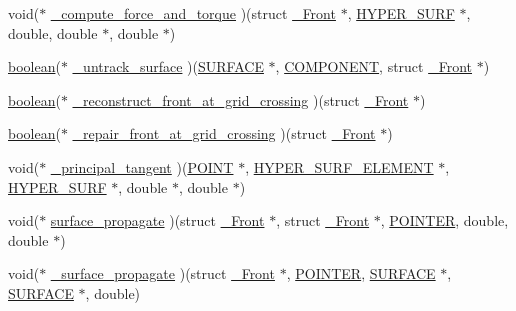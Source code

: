 \begin{DoxyCompactItemize}
\item 
void($\ast$ \hyperlink{struct___front_ae96863439bded0116ac2b342ffa994e1}{\+\_\+compute\+\_\+force\+\_\+and\+\_\+torque} )(struct \hyperlink{struct___front}{\+\_\+\+Front} $\ast$, \hyperlink{int_8h_acef50fa4757ce0d3f75c97fab5a175bc}{H\+Y\+P\+E\+R\+\_\+\+S\+U\+RF} $\ast$, double, double $\ast$, double $\ast$)
\item 
\hyperlink{cdecs_8h_ad048433382a936258fb49e2ec4f148e1}{boolean}($\ast$ \hyperlink{struct___front_aa8daaf6e0ce80e9c3d6e266b57a50e0d}{\+\_\+untrack\+\_\+surface} )(\hyperlink{int_8h_a1520d8870b5eafd76bd401aecb121ffd}{S\+U\+R\+F\+A\+CE} $\ast$, \hyperlink{int_8h_a2bb7be12ca59ea6443c8757df0a7c278}{C\+O\+M\+P\+O\+N\+E\+NT}, struct \hyperlink{struct___front}{\+\_\+\+Front} $\ast$)
\item 
\hyperlink{cdecs_8h_ad048433382a936258fb49e2ec4f148e1}{boolean}($\ast$ \hyperlink{struct___front_a999d7f1b6956921b4b3ff164dea01d87}{\+\_\+reconstruct\+\_\+front\+\_\+at\+\_\+grid\+\_\+crossing} )(struct \hyperlink{struct___front}{\+\_\+\+Front} $\ast$)
\item 
\hyperlink{cdecs_8h_ad048433382a936258fb49e2ec4f148e1}{boolean}($\ast$ \hyperlink{struct___front_a5990b74ab1e3f34ecdaf4ac4fa8d1ed5}{\+\_\+repair\+\_\+front\+\_\+at\+\_\+grid\+\_\+crossing} )(struct \hyperlink{struct___front}{\+\_\+\+Front} $\ast$)
\item 
void($\ast$ \hyperlink{struct___front_a7ed50ad2f247eb749c567b421aeb737e}{\+\_\+principal\+\_\+tangent} )(\hyperlink{int_8h_a3a87c5c9d0146e30a4bf720f701e5a63}{P\+O\+I\+NT} $\ast$, \hyperlink{int_8h_a17e21ae7174174d7a55516f8c9a8f12f}{H\+Y\+P\+E\+R\+\_\+\+S\+U\+R\+F\+\_\+\+E\+L\+E\+M\+E\+NT} $\ast$, \hyperlink{int_8h_acef50fa4757ce0d3f75c97fab5a175bc}{H\+Y\+P\+E\+R\+\_\+\+S\+U\+RF} $\ast$, double $\ast$, double $\ast$)
\item 
void($\ast$ \hyperlink{struct___front_a601a0a2e0085b77301f642c167e620f3}{surface\+\_\+propagate} )(struct \hyperlink{struct___front}{\+\_\+\+Front} $\ast$, struct \hyperlink{struct___front}{\+\_\+\+Front} $\ast$, \hyperlink{cdecs_8h_ae51a81000f343b8ec43bca1f6a723d7b}{P\+O\+I\+N\+T\+ER}, double, double $\ast$)
\item 
void($\ast$ \hyperlink{struct___front_ac039d7e67fc355f6699052b7fc20f3e0}{\+\_\+surface\+\_\+propagate} )(struct \hyperlink{struct___front}{\+\_\+\+Front} $\ast$, \hyperlink{cdecs_8h_ae51a81000f343b8ec43bca1f6a723d7b}{P\+O\+I\+N\+T\+ER}, \hyperlink{int_8h_a1520d8870b5eafd76bd401aecb121ffd}{S\+U\+R\+F\+A\+CE} $\ast$, \hyperlink{int_8h_a1520d8870b5eafd76bd401aecb121ffd}{S\+U\+R\+F\+A\+CE} $\ast$, double)

\end{DoxyCompactItemize}
